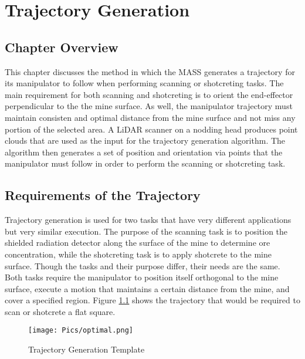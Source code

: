 \chapter{Trajectory Generation}
\label{chap:traj}
\section{Chapter Overview}
This chapter discusses the method in which the MASS generates a trajectory for its manipulator to follow when performing scanning or shotcreting tasks. The main requirement for both scanning and shotcreting is to orient the end-effector perpendicular to the the mine surface. As well, the manipulator trajectory must maintain consisten and optimal distance from the mine surface and not miss any portion of the selected area. A LiDAR scanner on a nodding head produces point clouds that are used as the input for the trajectory generation algorithm. The algorithm then generates a set of position and orientation via points that the manipulator must follow in order to perform the scanning or shotcreting task.\\

\section{Requirements of the Trajectory}

Trajectory generation is used for two tasks that have very different applications but very similar execution. The purpose of the scanning task is to position the shielded radiation detector along the surface of the mine to determine ore concentration, while the shotcreting task is to apply shotcrete to the mine surface. Though the tasks and their purpose differ, their needs are the same. Both tasks require the manipulator to position itself orthogonal to the mine surface, execute a motion that maintains a certain distance from the mine, and cover a specified region. Figure \ref{fig:idealspray} shows the trajectory that would be required to scan or shotcrete a flat square.\\

\begin{figure}[h]
    \centering
    \texttt{[image: Pics/optimal.png]}
    \caption{Trajectory Generation Template}
    \label{fig:idealspray}
\end{figure}

